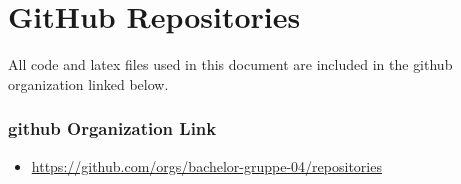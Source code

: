 \chapter{GitHub Repositories}
\label{app:github-repositories}

All code and \gls{latex} files used in this document are included in the \gls{github} organization linked below.

\subsection*{\gls{github} Organization Link}

\begin{itemize}
    \item \url{https://github.com/orgs/bachelor-gruppe-04/repositories}
\end{itemize}